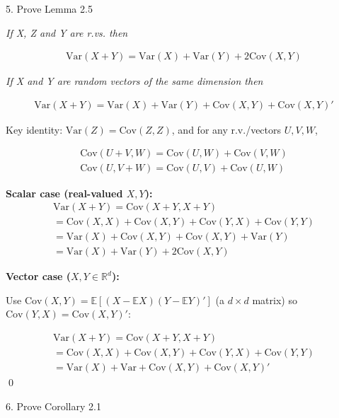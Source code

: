 \documentclass[10pt]{article}
\begin{document}
\newpage

5. Prove Lemma 2.5

\textit{If X, Z and Y are r.vs. then}

\begin{gather*}
    \text{Var}(X + Y) = \text{Var}(X) + \text{Var}(Y) + 2\text{Cov}(X, Y)
\end{gather*}

\textit{If X and Y are random vectors of the same dimension then}

\begin{gather*}
    \text{Var}(X + Y) = \text{Var}(X) + \text{Var}(Y) + \text{Cov}(X, Y) + \text{Cov}(X, Y)'
\end{gather*}

Key identity: $\text{Var}(Z) = \text{Cov}(Z, Z)$, and for any r.v./vectors $U, V, W$,

\begin{gather*}
    \text{Cov}(U + V, W) = \text{Cov}(U, W) + \text{Cov}(V, W)\\
    \text{Cov}(U, V + W) = \text{Cov}(U, V) + \text{Cov}(U, W)
\end{gather*}

\textbf{Scalar case (real-valued $X, Y$):}
\begin{gather*}
    \text{Var}(X + Y) = \text{Cov}(X + Y, X + Y)\\
    = \text{Cov}(X, X) + \text{Cov}(X, Y) + \text{Cov}(Y, X) + \text{Cov}(Y, Y)\\
    = \text{Var}(X) + \text{Cov}(X, Y) + \text{Cov}(X, Y) + \text{Var}(Y)\\
    = \text{Var}(X) + \text{Var}(Y) + 2\text{Cov}(X, Y)
\end{gather*}

\textbf{Vector case ($X, Y \in \mathbb{R}^d$):}

Use $\text{Cov}(X, Y) = \mathbb{E}[(X - \mathbb{E}X)(Y - \mathbb{E}Y)']$ (a $d \times d$ matrix) so $\text{Cov}(Y, X) = \text{Cov}(X, Y)'$:

\begin{gather*}
    \text{Var}(X + Y) = \text{Cov}(X + Y, X + Y) \\
    = \text{Cov}(X, X) + \text{Cov}(X, Y) + \text{Cov}(Y, X) + \text{Cov}(Y, Y)\\
    = \text{Var}(X) + \text{Var} + \text{Cov}(X, Y) + \text{Cov}(X, Y)'
\end{gather*}
\qed

\newpage

6. Prove Corollary 2.1
\end{document}
